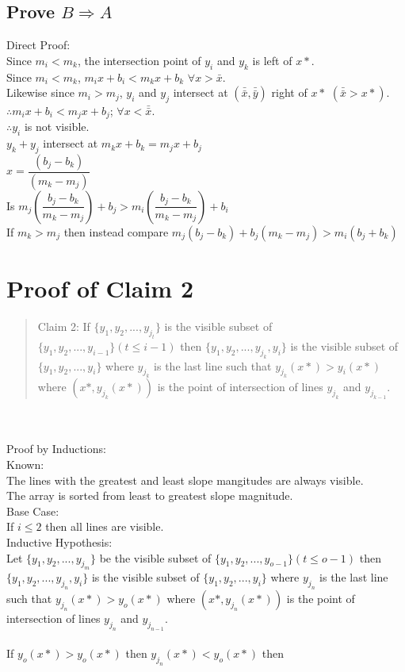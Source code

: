 \documentclass{article}
\begin{document}
\subsection*{Prove $B \Rightarrow A$}
Direct Proof:\\
Since $m_i < m_k$, the intersection point of $y_i$ and $y_k$ is left of $x*$.\\
Since $m_i < m_k$, $m_i x + b_i < m_k x + b_k$ $\forall{x > \bar{x}}$.\\
Likewise since $m_i > m_j$, $y_i$ and $y_j$ intersect at $(\bar{\bar{x}}, \bar{\bar{y}})$ right of $x*$ $(\bar{\bar{x}} > x*)$.\\
$\therefore m_i x + b_i < m_j x + b_j$; $\forall{x < \bar{\bar{x}}}$.\\
$\therefore y_i$ is not visible.\\
$y_k + y_j$ intersect at $m_k x + b_k = m_j x + b_j$\\
$x = \dfrac{(b_j - b_k)}{(m_k - m_j)}$\\
Is $m_j \left( \dfrac{b_j - b_k}{m_k - m_j}\right) + b_j > m_i \left(\dfrac{b_j - b_k}{m_k - m_j}\right) + b_i$\\
If $m_k > m_j$ then instead compare $m_j (b_j - b_k) + b_j (m_k - m_j) > m_i (b_j + b_k)$

\section*{Proof of Claim 2}
\begin{quote}
Claim 2: If $\{y_1, y_2,...,y_{j_{t}}\}$ is the visible subset of $\{y_1, y_2,...,y_{i - 1}\} (t \leq i - 1)$ then $\{y_1, y_2,...,y_{j_{k}}, y_i\}$ is the visible subset of $\{y_1, y_2,...,y_{i}\}$ where $y_{j_{k}}$ is the last line such that $y_{j_{k}} (x*) > y_i (x*)$ where $(x*, y_{j_{k}}(x*))$ is the point of intersection of lines $y_{j_{k}}$ and $y_{j_{k - 1}}$.
\end{quote}\\
\\
Proof by Inductions:\\
Known:\\
The lines with the greatest and least slope mangitudes are always visible.\\
The array is sorted from least to greatest slope magnitude.\\
Base Case:\\
If $i \leq 2$ then all lines are visible.\\
Inductive Hypothesis:\\
Let $\{y_1, y_2,...,y_{j_{m}}\}$ be the visible subset of $\{y_1, y_2,...,y_{o - 1}\} (t \leq o - 1)$ then $\{y_1, y_2,...,y_{j_{n}}, y_i\}$ is the visible subset of $\{y_1, y_2,...,y_{i}\}$ where $y_{j_{n}}$ is the last line such that $y_{j_{n}} (x*) > y_o (x*)$ where $(x*, y_{j_{n}}(x*))$ is the point of intersection of lines $y_{j_{n}}$ and $y_{j_{n - 1}}$.\\
\\
If $y_o (x*) > y_o (x*)$ then 
$y_{j_n}(x*) < y_o (x*)$ then 
\end{document}
